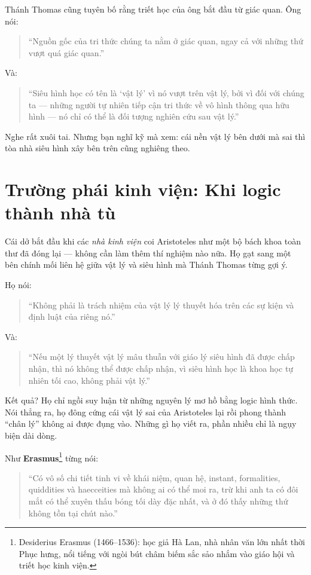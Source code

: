 Thánh Thomas cũng tuyên bố rằng triết học của ông bắt đầu từ giác quan. Ông nói:
\begin{quote}
“Nguồn gốc của tri thức chúng ta nằm ở giác quan, ngay cả với những thứ vượt quá giác quan.”
\end{quote}

Và:
\begin{quote}
“Siêu hình học có tên là ‘vật lý’ vì nó vượt trên vật lý, bởi vì đối với chúng ta — những người tự nhiên tiếp cận tri thức về vô hình thông qua hữu hình — nó chỉ có thể là đối tượng nghiên cứu sau vật lý.”
\end{quote}

Nghe rất xuôi tai. Nhưng bạn nghĩ kỹ mà xem: cái nền vật lý bên dưới mà sai thì tòa nhà siêu hình xây bên trên cũng nghiêng theo.


\section{Trường phái kinh viện: Khi logic thành nhà tù}

Cái dở bắt đầu khi các \emph{nhà kinh viện} coi Aristoteles như một bộ bách khoa toàn thư đã đóng lại — không cần làm thêm thí nghiệm nào nữa. Họ gạt sang một bên chính mối liên hệ giữa vật lý và siêu hình mà Thánh Thomas từng gợi ý.

Họ nói:

\begin{quote}
“Không phải là trách nhiệm của vật lý lý thuyết hóa trên các sự kiện và định luật của riêng nó.”
\end{quote}

Và:
\begin{quote}
“Nếu một lý thuyết vật lý mâu thuẫn với giáo lý siêu hình đã được chấp nhận, thì nó không thể được chấp nhận, vì siêu hình học là khoa học tự nhiên tối cao, không phải vật lý.”
\end{quote}

Kết quả? Họ chỉ ngồi suy luận từ những nguyên lý mơ hồ bằng logic hình thức. Nói thẳng ra, họ đông cứng cái vật lý sai của Aristoteles lại rồi phong thành “chân lý” không ai được đụng vào. Những gì họ viết ra, phần nhiều chỉ là ngụy biện dài dòng.

Như \textbf{Erasmus}\footnote{Desiderius Erasmus (1466--1536): học giả Hà Lan, nhà nhân văn lớn nhất thời Phục hưng, nổi tiếng với ngòi bút châm biếm sắc sảo nhắm vào giáo hội và triết học kinh viện.} từng nói:
\begin{quote}
“Có vô số chi tiết tinh vi về khái niệm, quan hệ, instant, formalities, quiddities và haecceities mà không ai có thể moi ra, trừ khi anh ta có đôi mắt có thể xuyên thấu bóng tối dày đặc nhất, và ở đó thấy những thứ không tồn tại chút nào.”
\end{quote}


